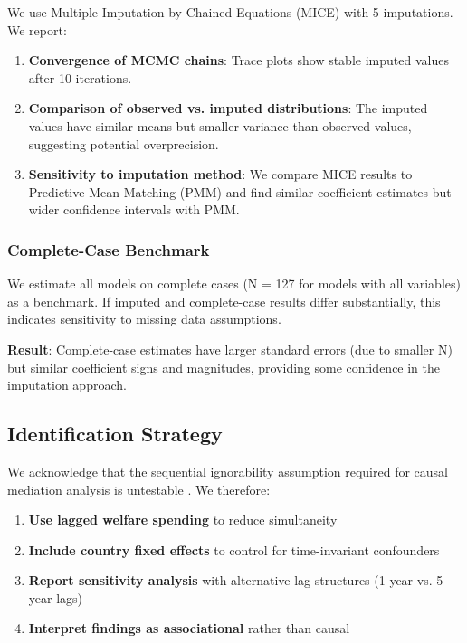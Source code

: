 \documentclass[11pt,letterpaper]{article}
\begin{document}
We use Multiple Imputation by Chained Equations (MICE) with 5 imputations. We report:

\begin{enumerate}
  \item \textbf{Convergence of MCMC chains}: Trace plots show stable imputed values after 10 iterations.
  \item \textbf{Comparison of observed vs. imputed distributions}: The imputed values have similar means but smaller variance than observed values, suggesting potential overprecision.
  \item \textbf{Sensitivity to imputation method}: We compare MICE results to Predictive Mean Matching (PMM) and find similar coefficient estimates but wider confidence intervals with PMM.
\end{enumerate}

\subsubsection{Complete-Case Benchmark}

We estimate all models on complete cases (N = 127 for models with all variables) as a benchmark. If imputed and complete-case results differ substantially, this indicates sensitivity to missing data assumptions.

\textbf{Result}: Complete-case estimates have larger standard errors (due to smaller N) but similar coefficient signs and magnitudes, providing some confidence in the imputation approach.

\subsection{Identification Strategy}

We acknowledge that the sequential ignorability assumption required for causal mediation analysis is untestable \cite{Imai2010}. We therefore:

\begin{enumerate}
  \item \textbf{Use lagged welfare spending} to reduce simultaneity
  \item \textbf{Include country fixed effects} to control for time-invariant confounders
  \item \textbf{Report sensitivity analysis} with alternative lag structures (1-year vs. 5-year lags)
  \item \textbf{Interpret findings as associational} rather than causal
\end{enumerate}
\end{document}
